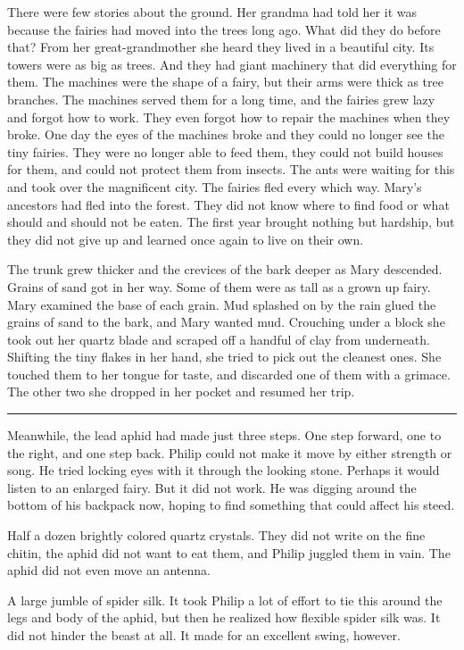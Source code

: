 \documentclass[10pt]{memoir}
\renewcommand{\pfbreakdisplay}{\bigskip \ding{166} \bigskip}
\newcommand{\secbreak}{\fancybreak{\pfbreakdisplay}}
\begin{document}
There were few stories about the ground. Her grandma had told her it was
because the fairies had moved into the trees long ago. What did they do before
that? From her great-grandmother she heard they lived in a beautiful city. Its
towers were as big as trees. And they had giant machinery that did everything
for them. The machines were the shape of a fairy, but their arms were thick as
tree branches. The machines served them for a long time, and the fairies grew
lazy and forgot how to work. They even forgot how to repair the machines when
they broke. One day the eyes of the machines broke and they could no longer see
the tiny fairies. They were no longer able to feed them, they could not build
houses for them, and could not protect them from insects. The ants were waiting
for this and took over the magnificent city. The fairies fled every which way.
Mary's ancestors had fled into the forest. They did not know where to find food
or what should and should not be eaten. The first year brought nothing but
hardship, but they did not give up and learned once again to live on their own.

The trunk grew thicker and the crevices of the bark deeper as Mary descended.
Grains of sand got in her way. Some of them were as tall as a grown up fairy.
Mary examined the base of each grain. Mud splashed on by the rain glued the
grains of sand to the bark, and Mary wanted mud. Crouching under a block she
took out her quartz blade and scraped off a handful of clay from underneath.
Shifting the tiny flakes in her hand, she tried to pick out the cleanest ones.
She touched them to her tongue for taste, and discarded one of them with a
grimace. The other two she dropped in her pocket and resumed her trip.

\secbreak

Meanwhile, the lead aphid had made just three steps. One step forward, one to
the right, and one step back. Philip could not make it move by either strength
or song. He tried locking eyes with it through the looking stone. Perhaps it
would listen to an enlarged fairy. But it did not work. He was digging around
the bottom of his backpack now, hoping to find something that could affect his
steed.

Half a dozen brightly colored quartz crystals. They did not write on the fine
chitin, the aphid did not want to eat them, and Philip juggled them in vain.
The aphid did not even move an antenna.

A large jumble of spider silk. It took Philip a lot of effort to tie this
around the legs and body of the aphid, but then he realized how flexible spider
silk was. It did not hinder the beast at all. It made for an excellent swing,
however.
\end{document}
